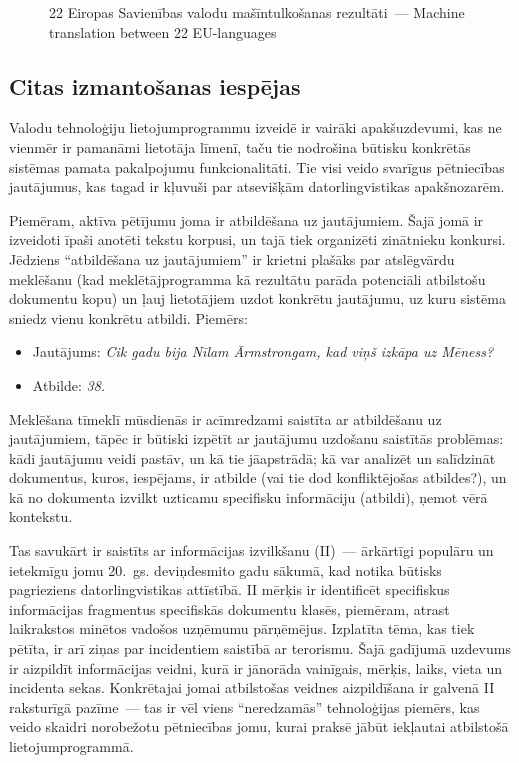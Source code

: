 \begin{multicols}{2}
\begin{figure}[htbp]
\begin{tabular}{>{\columncolor{corange1}}cccccccccccccccccccccccc}
    \end{tabular}
  \caption{22 Eiropas Savienības valodu mašīntulkošanas rezultāti~--- \textcolor{grey1}{Machine translation between 22 EU-languages}}
  \label{fig:euromatrix_po}
\end{figure}

\subsection{Citas izmantošanas iespējas}

Valodu tehnoloģiju lietojumprogrammu izveidē ir vairāki apakšuzdevumi, kas ne vienmēr ir pamanāmi lietotāja līmenī, taču tie nodrošina būtisku konkrētās sistēmas pamata pakalpojumu funkcionalitāti.
Tie visi veido svarīgus pētniecības jautājumus, kas tagad ir kļuvuši par atsevišķām datorlingvistikas apakš\-nozarēm. 

Piemēram, aktīva pētījumu joma ir atbildēšana uz jautājumiem.
Šajā jomā ir izveidoti īpaši anotēti tekstu korpusi, un tajā tiek organizēti zinātnieku konkursi. 
Jēdziens “atbildēšana uz jautājumiem” ir krietni plašāks par atslēgvārdu meklēšanu (kad meklētājprogramma kā rezultātu parāda potenciāli atbilstošu dokumentu kopu) un ļauj lietotājiem uzdot konkrētu jautājumu, uz kuru sistēma sniedz vienu konkrētu atbildi.
Piemērs:

\begin{itemize}
\item[] Jautājums: \textit{Cik gadu bija Nīlam Ārmstrongam, kad viņš izkāpa uz Mēness?}
\item[] Atbilde: \textit{38.}
\end{itemize}
Meklēšana tīmeklī mūsdienās ir acīmredzami saistīta ar atbildēšanu uz jautājumiem, tāpēc ir būtiski izpētīt ar jautājumu uzdošanu saistītās problēmas: kādi jautājumu veidi pastāv, un kā tie jāapstrādā; kā var analizēt un salīdzināt dokumentus, kuros, iespējams, ir atbilde (vai tie dod konfliktējošas atbildes?), un kā no dokumenta izvilkt uzticamu specifisku informāciju (atbildi), ņemot vērā kontekstu. 


Tas savukārt ir saistīts ar informācijas izvilkšanu (II)~--- ārkārtīgi populāru un ietekmīgu jomu 20.~gs. deviņdesmito gadu sākumā, kad notika būtisks pagrieziens datorlingvistikas attīstībā.
II mērķis ir identificēt specifiskus informācijas fragmentus specifiskās dokumentu klasēs, piemēram, atrast laikrakstos minētos vadošos uzņēmumu pārņēmējus.
Izplatīta tēma, kas tiek pētīta, ir arī ziņas par incidentiem saistībā ar terorismu.
Šajā gadījumā uzdevums ir aizpildīt informācijas veidni, kurā ir jānorāda vainīgais, mērķis, laiks, vieta un incidenta sekas.
Konkrētajai jomai atbilstošas veidnes aizpildīšana ir galvenā II raksturīgā pazīme~--- tas ir vēl viens “neredzamās” tehnoloģijas piemērs, kas veido skaidri norobežotu pētniecības jomu, kurai praksē jābūt iekļautai atbilstošā lietojumprogrammā. 


\end{multicols}

